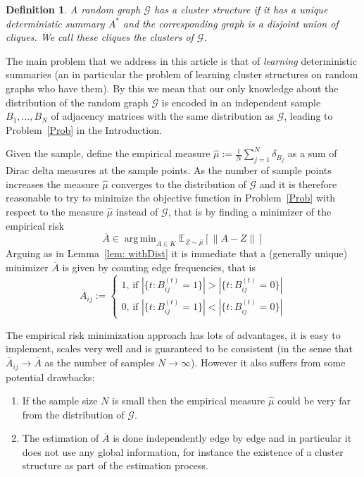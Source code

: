 \documentclass[12pt]{amsart}
\newtheorem{definition}[lemma]{Definition}
\theoremstyle{remark}
\DeclareMathOperator*{\argmin}{arg\,min}
\newcommand{\EE}{\mathbb{E}}
\newcommand{\grG}{{\mathcal{G}}}
\begin{document}
\begin{definition} A random graph $\grG$ has a {\it cluster structure} if it has a unique deterministic summary $A^*$ and the corresponding graph is a disjoint union of cliques. We call these cliques the clusters of $\grG$.
\end{definition}

The main problem that we address in this article is that of {\it learning} deterministic summaries (an in particular the problem of learning cluster structures on random graphs who have them). By this we mean that our only knowledge about the distribution of the random graph $\grG$ is encoded in an independent sample $B_1,\dots, B_N$ of adjacency matrices with the same distribution as $\grG$, leading to Problem~\ref{Prob} in the Introduction. 



Given the sample, define the empirical measure $\hat{\mu}:=\frac{1}{N}\sum_{j=1}^N \delta_{B_j}$ as a sum of Dirac delta measures at the sample points. As the number of sample points increases the measure $\hat{\mu}$ converges to the distribution of $\grG$ and it is therefore reasonable to try to minimize the objective function in Problem~\ref{Prob} with respect to the measure $\hat{\mu}$ instead of $\grG$, that is by finding a minimizer of the empirical risk
\[\overline{A}\in\argmin _{A\in K} \EE_{Z\sim \hat{\mu}}[\|A-Z\|]\]
Arguing as in Lemma~\ref{lem: withDist} it is immediate that a (generally unique) minimizer $\overline{A}$ is given by counting edge frequencies, that is
\[ 
\overline{A}_{ij}:=\begin{cases}
1\text{, if $|\{t: B^{(t)}_{ij}=1\}|>|\{t: B^{(t)}_{ij}=0\}|$}\\
0\text{, if $|\{t: B^{(t)}_{ij}=1\}|<|\{t: B^{(t)}_{ij}=0\}|$}
\end{cases}
\]

The empirical risk minimization approach has lots of advantages, it is easy to implement, scales very well and is guaranteed to be consistent (in the sense that $\overline{A}_{ij}\rightarrow \overline{A}$ as the number of samples $N\rightarrow \infty$). However it also suffers from some potential drawbacks:

\begin{enumerate}
\item If the sample size $N$ is small then the empirical measure $\hat\mu$ could be very far from the distribution of $\grG$.
\item The estimation of $\overline{A}$ is done independently edge by edge and in particular it does not use any global information, for instance the existence of a cluster structure as part of the estimation process.
\end{enumerate}
\end{document}
